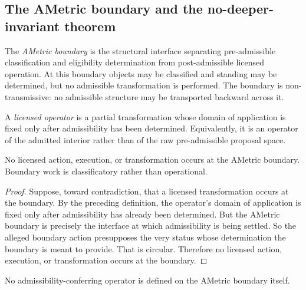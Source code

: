 \subsection{The AMetric boundary and the no-deeper-invariant theorem}

\begin{definition}
The \emph{AMetric boundary} is the structural interface separating pre-admissible classification and eligibility determination from post-admissible licensed operation. At this boundary objects may be classified and standing may be determined, but no admissible transformation is performed. The boundary is non-transmissive: no admissible structure may be transported backward across it.
\end{definition}

\begin{definition}
A \emph{licensed operator} is a partial transformation whose domain of application is fixed only after admissibility has been determined. Equivalently, it is an operator of the admitted interior rather than of the raw pre-admissible proposal space.
\end{definition}

\begin{theorem}
\label{thm:boundary-non-action}
No licensed action, execution, or transformation occurs at the AMetric boundary. Boundary work is classificatory rather than operational.
\end{theorem}

\begin{proof}
Suppose, toward contradiction, that a licensed transformation occurs at the boundary. By the preceding definition, the operator's domain of application is fixed only after admissibility has already been determined. But the AMetric boundary is precisely the interface at which admissibility is being settled. So the alleged boundary action presupposes the very status whose determination the boundary is meant to provide. That is circular. Therefore no licensed action, execution, or transformation occurs at the boundary.\cite{MaleyAMetric,MaleyNecessity}
\end{proof}

\begin{theorem}
\label{thm:operator-undefinedness-boundary}
No admissibility-conferring operator is defined on the AMetric boundary itself.
\end{theorem}

